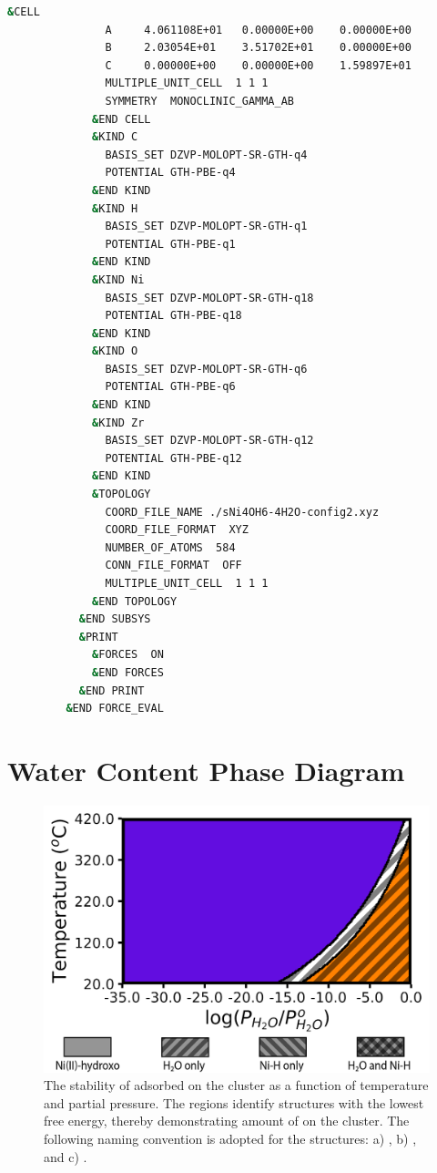 \documentclass[12pt]{article}
\begin{document}
\begin{center}
\begin{lstlisting}[language=bash]
             &CELL
               A     4.061108E+01   0.00000E+00    0.00000E+00
               B     2.03054E+01    3.51702E+01    0.00000E+00
               C     0.00000E+00    0.00000E+00    1.59897E+01
               MULTIPLE_UNIT_CELL  1 1 1
               SYMMETRY  MONOCLINIC_GAMMA_AB
             &END CELL
             &KIND C
               BASIS_SET DZVP-MOLOPT-SR-GTH-q4
               POTENTIAL GTH-PBE-q4
             &END KIND
             &KIND H
               BASIS_SET DZVP-MOLOPT-SR-GTH-q1
               POTENTIAL GTH-PBE-q1
             &END KIND
             &KIND Ni
               BASIS_SET DZVP-MOLOPT-SR-GTH-q18
               POTENTIAL GTH-PBE-q18
             &END KIND
             &KIND O
               BASIS_SET DZVP-MOLOPT-SR-GTH-q6
               POTENTIAL GTH-PBE-q6
             &END KIND
             &KIND Zr
               BASIS_SET DZVP-MOLOPT-SR-GTH-q12
               POTENTIAL GTH-PBE-q12
             &END KIND
             &TOPOLOGY
               COORD_FILE_NAME ./sNi4OH6-4H2O-config2.xyz
               COORD_FILE_FORMAT  XYZ
               NUMBER_OF_ATOMS  584
               CONN_FILE_FORMAT  OFF
               MULTIPLE_UNIT_CELL  1 1 1
             &END TOPOLOGY
           &END SUBSYS
           &PRINT
             &FORCES  ON
             &END FORCES
           &END PRINT
         &END FORCE_EVAL
    \end{lstlisting}
\end{center}

\newpage

\section{Water Content Phase Diagram}
    \begin{figure}[H]
        \centering
        \includegraphics{zi-images/00-General-Graphics/2021-figure-H2O-phase-diagram-manuscript.png}
        \caption{The stability of adsorbed  on the  cluster as a function of temperature and  partial pressure. The regions identify structures with the lowest free energy, thereby demonstrating amount of  on the cluster. The following naming convention is adopted for the structures: a) , b) , and c) .}
        \label{fig:h2o-partial-pressure}
    \end{figure}
\end{document}
